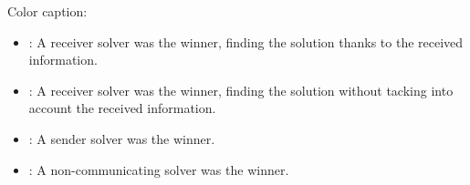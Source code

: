 Color caption:
\begin{itemize}
\item {}: A receiver solver was the winner, finding the solution thanks to the received information.
\item {}: A receiver solver was the winner, finding the solution without tacking into account the received information.
\item {}: A sender solver was the winner.
\item {}: A non-communicating solver was the winner.
\end{itemize}


\clearpage
